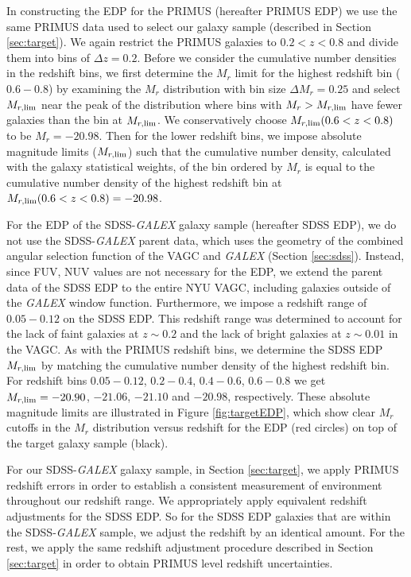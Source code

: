 \documentclass{emulateapj}
\begin{document}
In constructing the EDP for the PRIMUS (hereafter PRIMUS EDP) we use the same PRIMUS data used to select our galaxy sample (described in Section \ref{sec:target}). We again restrict the PRIMUS galaxies to $0.2 < z < 0.8$ and divide them into bins of $\Delta z = 0.2$. Before we consider the cumulative number densities in the redshift bins, we first determine the $M_r$ limit for the highest redshift bin ($0.6-0.8$) by examining the $M_{r}$ distribution with bin size $\Delta M_{r} = 0.25$ and select $M_{r,\rm{lim}}$ near the peak of the distribution where bins with $M_{r} > M_{r,\rm{lim}}$ have fewer galaxies than the bin at $M_{r, \rm{lim}}$. We conservatively choose $M_{r, \rm{lim}}(0.6 < z < 0.8)$ to be $M_{r} = -20.98$. Then for the lower redshift bins, we impose absolute magnitude limits ($M_{r,\rm{lim}}$) such that the cumulative number density, calculated with the galaxy statistical weights, of the bin ordered by $M_{r}$ is equal to the cumulative number density of the highest redshift bin at $M_{r, \rm{lim}}(0.6 < z < 0.8) = -20.98$. 

For the EDP of the SDSS-{\em GALEX} galaxy sample (hereafter SDSS EDP), we do not use the SDSS-{\em GALEX} parent data, which uses the geometry of the combined angular selection function of the VAGC and {\em GALEX} (Section \ref{sec:sdss}). Instead, since FUV, NUV values are not necessary for the EDP, we extend the parent data of the SDSS EDP to the entire NYU VAGC, including galaxies outside of the {\em GALEX} window function. Furthermore, we impose a redshift range of $0.05-0.12$ on the SDSS EDP. This redshift range was determined to account for the lack of faint galaxies at $z \sim 0.2$ and the lack of bright galaxies at $z \sim 0.01$ in the VAGC. As with the PRIMUS redshift bins, we determine the SDSS EDP $M_{r, \rm{lim}}$ by matching the cumulative number density of the highest redshift bin. For redshift bins $0.05-0.12$, $0.2-0.4$, $0.4-0.6$, $0.6-0.8$ we get $M_{r,\rm{lim}} = -20.90$, $-21.06$, $-21.10$ and $-20.98$, respectively. These absolute magnitude limits are illustrated in Figure \ref{fig:targetEDP}, which show clear $M_r$ cutoffs in the $M_{r}$ distribution versus redshift for the EDP (red circles) on top of the target galaxy sample (black). 

For our SDSS-{\em GALEX} galaxy sample, in Section \ref{sec:target}, we apply PRIMUS redshift errors in order to establish a consistent measurement of environment throughout our redshift range. We appropriately apply equivalent redshift adjustments for the SDSS EDP. So for the SDSS EDP galaxies that are within the SDSS-{\em GALEX} sample, we adjust the redshift by an identical amount. For the rest, we apply the same redshift adjustment procedure described in Section \ref{sec:target} in order to obtain PRIMUS level redshift uncertainties. 
\end{document}
